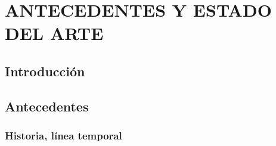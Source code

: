 \chapter{ANTECEDENTES Y ESTADO DEL ARTE}
\label{ch:2}
\section{Introducción}

\section{Antecedentes}

\subsection{Historia, línea temporal}

